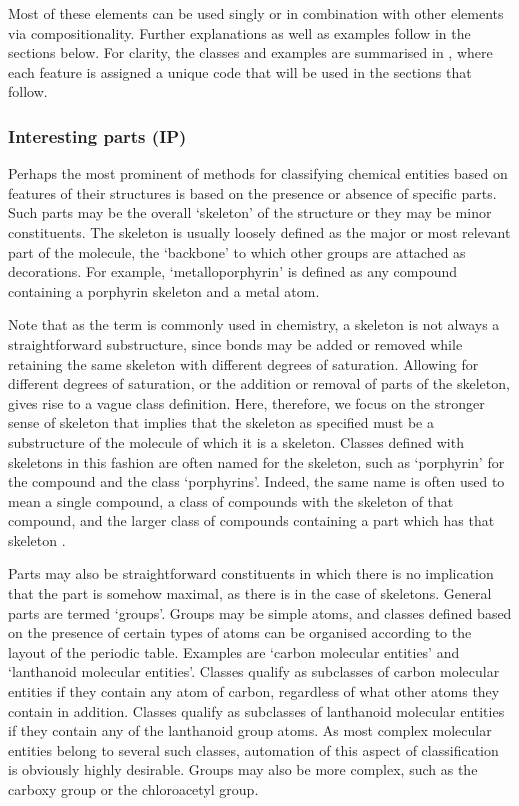 \documentclass[10pt]{bmc_article}
\newenvironment{bmcformat}{\baselineskip20pt\sloppy\setboolean{publ}{false}}{\baselineskip20pt\sloppy}
\begin{document}
\begin{bmcformat}
Most of these elements can be used singly or in combination with other elements via compositionality.  Further explanations as well as examples follow in the sections below. For clarity, the classes and examples are summarised in \textit{}, where each feature is assigned a unique code that will be used in the sections that follow.

\subsubsection*{Interesting parts (IP)}

Perhaps the most prominent of methods for classifying chemical entities based on features of their structures is based on the presence or absence of specific parts.  Such parts may be the overall `skeleton' of the structure or they may be minor constituents. The skeleton is usually loosely defined as the major or most relevant part of the molecule, the `backbone' to which other groups are attached as decorations. For example, `metalloporphyrin' is defined as any compound containing a porphyrin skeleton and a metal atom.  

Note that as the term is commonly used in chemistry, a skeleton is not always a straightforward substructure, since bonds may be added or removed while retaining the same skeleton with different degrees of saturation. Allowing for different degrees of saturation, or the addition or removal of parts of the skeleton, gives rise to a vague class definition. Here, therefore, we focus on the stronger sense of skeleton that implies that the skeleton as specified must be a substructure of the molecule of which it is a skeleton. Classes defined with skeletons in this fashion are often named for the skeleton, such as `porphyrin' for the compound and the class `porphyrins'. Indeed, the same name is often used to mean a single compound, a class of compounds with the skeleton of that compound, and the larger class of compounds containing a part which has that skeleton \cite{corbett2008}. 

Parts may also be straightforward constituents in which there is no implication that the part is somehow maximal, as there is in the case of skeletons.  General parts are termed `groups'. Groups may be simple atoms, and classes defined based on the presence of certain types of atoms can be organised according to the layout of the periodic table.  Examples are `carbon molecular entities' and `lanthanoid molecular entities'. Classes qualify as subclasses of carbon molecular entities if they contain any atom of carbon, regardless of what other atoms they contain in addition.  Classes qualify as subclasses of lanthanoid molecular entities if they contain any of the lanthanoid group atoms.  As most complex molecular entities belong to several such classes, automation of this aspect of classification is obviously highly desirable. Groups may also be more complex, such as the carboxy group or the chloroacetyl group. 


\end{bmcformat}
\end{document}
